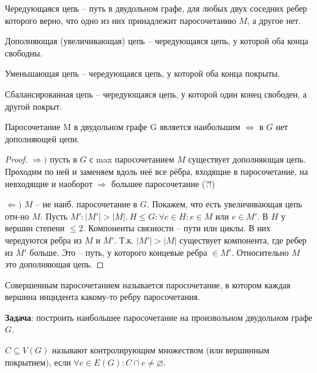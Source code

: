 	\begin{Def}
		Чередующаяся цепь -- путь в двудольном графе, для любых двух соседних ребер которого верно, что одно из них принадлежит паросочетанию $M$, а другое нет.
	\end{Def}

	\begin{Def}
		Дополняющая (увеличивающая) цепь -- чередующаяся цепь, у которой оба конца свободны.
	\end{Def}

	\begin{Def}
		Уменьшающая цепь -- чередующаяся цепь, у которой оба конца покрыты.
	\end{Def}

	\begin{Def}
		Сбалансированная цепь -- чередующаяся цепь, у которой один конец свободен, а другой покрыт.
	\end{Def}

	\begin{Thm}
		Паросочетание M в двудольном графе G является наибольшим $\Leftrightarrow$ в $G$ нет дополняющей цепи.
	\end{Thm}

	\begin{proof}
		$\Rightarrow)$ пусть в $G$ с max паросочетанием $M$ существует дополняющая цепь. Проходим по ней и заменяем вдоль неё все рёбра, входящие в паросочетание, на невходящие и наоборот $\Rightarrow$ большее паросочетание (?!)

		$\Leftarrow)$ $M$ -- не наиб. паросочетание в $G$. Покажем, что есть увеличивающая цепь отн-но $M$. Пусть $M': |M'| > |M|. \ H \leqslant G : \forall e \in H: e \in M$ или
		$e \in M'$. В $H$ у вершин степени $\leqslant 2$. Компоненты связности -- пути или циклы. В них чередуются ребра из $M$ и $M'$. 
		Т.к. $|M'| > |M|$ существует компонента, где ребер из $M'$ больше. Это -- путь, у которого концевые ребра $\in M'$. Относительно $M$ это дополняющая цепь.
	\end{proof}

	\begin{Def}
		Совершенным паросочетанием называется паросочетание, в котором каждая вершина инцидента какому-то ребру паросочетания.
	\end{Def}

	\textbf{Задача}: построить наибольшее паросочетание на произвольном двудольном графе $G$.

	\begin{Def}
		$C \subseteq V(G)$ называют контролирующим множеством (или вершинным покрытием), если $\forall e \in E(G) : C \cap e \neq \varnothing$.
	\end{Def}

